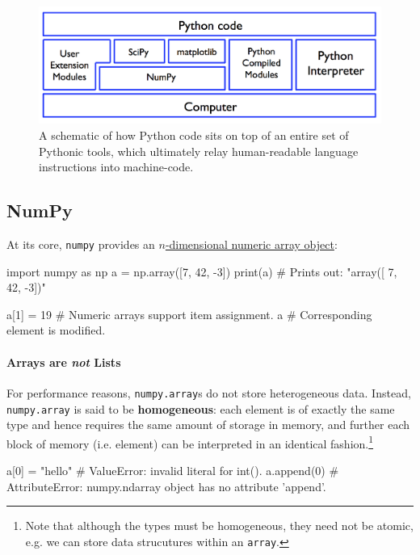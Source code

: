 \documentclass[12pt,letterpaper,twoside]{article}
\begin{document}
\begin{figure}[h]
\centering
\includegraphics[scale=0.45]{fig/python-stack.png}
\caption{A schematic of how Python code sits on top of an entire set
  of Pythonic tools, which ultimately relay human-readable language instructions into
  machine-code.}
\end{figure}

\subsection{NumPy}
At its core, \texttt{numpy} provides an
\href{https://docs.scipy.org/doc/numpy/reference/arrays.html}
{$n$-dimensional numeric array object}:

\begin{python}
import numpy as np
a = np.array([7, 42, -3])
print(a)                     # Prints out: "array([ 7, 42, -3])"

a[1] = 19                    # Numeric arrays support item assignment.
a                            # Corresponding element is modified.
\end{python}

\paragraph{Arrays are \emph{not} Lists}
For performance reasons, \texttt{numpy.array}s do not store
heterogeneous data.
Instead, \texttt{numpy.array} is said to be
\textbf{homogeneous}: each element is of exactly the same type and hence
requires the same amount of storage in memory, and further each block
of memory (i.e. element) can be interpreted in an identical
fashion.\footnote{Note that although the types must be homogeneous, they need
not be atomic, e.g. we can store data strucutures within an
\texttt{array}.}

\begin{python}
  a[0] = "hello"    # ValueError: invalid literal for int().
  a.append(0)       # AttributeError: numpy.ndarray object has no attribute 'append'.
\end{python}
\end{document}

